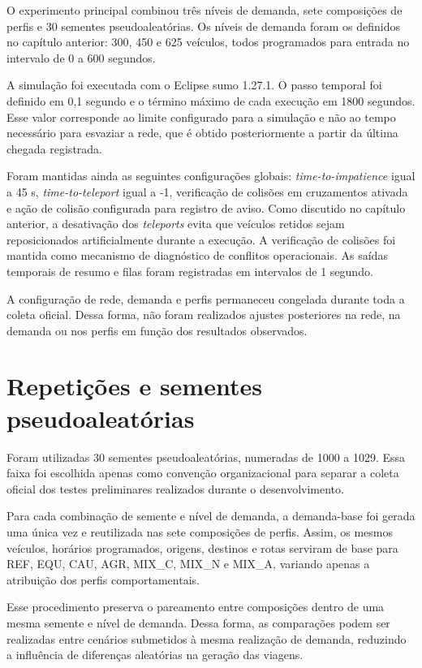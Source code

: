 O experimento principal combinou três níveis de demanda, sete composições de perfis e 30 sementes pseudoaleatórias. Os níveis de demanda foram os definidos no capítulo anterior: 300, 450 e 625 veículos, todos programados para entrada no intervalo de 0 a 600 segundos.

A simulação foi executada com o Eclipse \gls{sumo} 1.27.1. O passo temporal foi definido em 0,1 segundo e o término máximo de cada execução em 1800 segundos. Esse valor corresponde ao limite configurado para a simulação e não ao tempo necessário para esvaziar a rede, que é obtido posteriormente a partir da última chegada registrada.

Foram mantidas ainda as seguintes configurações globais: \textit{time-to-impatience} igual a 45 s, \textit{time-to-teleport} igual a -1, verificação de colisões em cruzamentos ativada e ação de colisão configurada para registro de aviso. Como discutido no capítulo anterior, a desativação dos \textit{teleports} evita que veículos retidos sejam reposicionados artificialmente durante a execução. A verificação de colisões foi mantida como mecanismo de diagnóstico de conflitos operacionais. As saídas temporais de resumo e filas foram registradas em intervalos de 1 segundo.

A configuração de rede, demanda e perfis permaneceu congelada durante toda a coleta oficial. Dessa forma, não foram realizados ajustes posteriores na rede, na demanda ou nos perfis em função dos resultados observados.

\section{Repetições e sementes pseudoaleatórias}

Foram utilizadas 30 sementes pseudoaleatórias, numeradas de 1000 a 1029. Essa faixa foi escolhida apenas como convenção organizacional para separar a coleta oficial dos testes preliminares realizados durante o desenvolvimento.

Para cada combinação de semente e nível de demanda, a demanda-base foi gerada uma única vez e reutilizada nas sete composições de perfis. Assim, os mesmos veículos, horários programados, origens, destinos e rotas serviram de base para REF, EQU, CAU, AGR, MIX\_C, MIX\_N e MIX\_A, variando apenas a atribuição dos perfis comportamentais.

Esse procedimento preserva o pareamento entre composições dentro de uma mesma semente e nível de demanda. Dessa forma, as comparações podem ser realizadas entre cenários submetidos à mesma realização de demanda, reduzindo a influência de diferenças aleatórias na geração das viagens.

